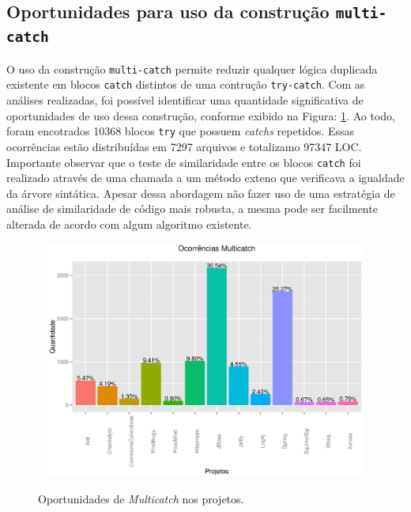 \subsection{Oportunidades para uso da constru\c c\~{a}o \texttt{multi-catch}}

O uso da constru\c c\~{a}o \texttt{multi-catch} permite reduzir qualquer 
l\'{o}gica duplicada existente em blocos \texttt{catch} distintos de 
uma contru\c c\~{a}o \texttt{try-catch}. Com as an\'{a}lises realizadas, 
foi poss\'{i}vel identificar uma quantidade significativa de oportunidades 
de uso dessa constru\c c\~{a}o, conforme exibido na Figura: \ref{fig:Muticatch}. Ao todo, 
foram encotrados \num{10368} blocos \texttt{try} que possuem \textit{catchs} repetidos. 
Essas ocorrências estão distribuídas em \num{7297} arquivos e totalizamo \num{97347} \acs{LOC}. 
Importante observar que o teste de  similaridade entre os blocos \texttt{catch} 
foi realizado através de uma chamada a um método exteno que verificava a igualdade da \'{a}rvore 
sint\'{a}tica. Apesar dessa abordagem n\~{a}o fazer uso de uma estrat\'{e}gia de an\'{a}lise 
de similaridade de c\'{o}digo mais robusta, a mesma pode ser facilmente alterada de 
acordo com algum algoritmo existente. 


\begin{figure}[h]
	\center
	\includegraphics[width=13cm,height=7.8cm]{Imagens/ocorrenciasMulticatch}
	\label{fig:Muticatch}
	\caption{Oportunidades de \textit{Multicatch} nos projetos.}
\end{figure}
		


